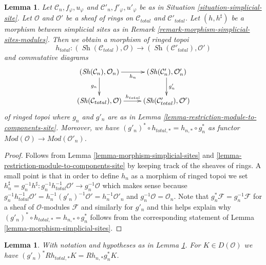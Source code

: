 \documentclass{stacks-project}
\theoremstyle{plain}
\newtheorem{lemma}[subsection]{Lemma}
\theoremstyle{definition}
\theoremstyle{remark}
\numberwithin{equation}{subsection}
\def\Sh{\mathop{\mathit{Sh}}\nolimits}
\begin{document}
\begin{lemma}
\label{lemma-morphism-simplicial-sites-modules}
Let $\mathcal{C}_n, f_\varphi, u_\varphi$ and
$\mathcal{C}'_n, f'_\varphi, u'_\varphi$ be as in
Situation \ref{situation-simplicial-site}.
Let $\mathcal{O}$ and $\mathcal{O}'$
be a sheaf of rings on $\mathcal{C}_{total}$ and $\mathcal{C}'_{total}$.
Let $(h, h^\sharp)$ be a morphism between simplicial sites as in
Remark \ref{remark-morphism-simplicial-sites-modules}.
Then we obtain a morphism of ringed topoi
$$
h_{total} :
(\Sh(\mathcal{C}_{total}), \mathcal{O})
\to
(\Sh(\mathcal{C}'_{total}), \mathcal{O}')
$$
and commutative diagrams
$$
\xymatrix{
(\Sh(\mathcal{C}_n), \mathcal{O}_n) \ar[d]_{g_n} \ar[r]_{h_n} &
(\Sh(\mathcal{C}'_n), \mathcal{O}'_n) \ar[d]^{g'_n} \\
(\Sh(\mathcal{C}_{total}), \mathcal{O}) \ar[r]^{h_{total}} &
(\Sh(\mathcal{C}'_{total}), \mathcal{O}')
}
$$
of ringed topoi where $g_n$ and $g'_n$ are as in
Lemma \ref{lemma-restriction-module-to-components-site}.
Moreover, we have
$(g'_n)^* \circ h_{total, *} = h_{n, *} \circ g_n^*$
as functor $\textit{Mod}(\mathcal{O}) \to \textit{Mod}(\mathcal{O}'_n)$.
\end{lemma}

\begin{proof}
Follows from
Lemma \ref{lemma-morphism-simplicial-sites} and
\ref{lemma-restriction-module-to-components-site}
by keeping track of the sheaves of rings.
A small point is that in order to define $h_n$ as a morphism
of ringed topoi we set
$h_n^\sharp = g_n^{-1}h^\sharp :
g_n^{-1}h_{total}^{-1}\mathcal{O}' \to g_n^{-1}\mathcal{O}$
which makes sense because
$g_n^{-1}h_{total}^{-1}\mathcal{O}' = h_n^{-1}(g'_n)^{-1}\mathcal{O}' =
h_n^{-1}\mathcal{O}'_n$ and $g_n^{-1}\mathcal{O} = \mathcal{O}_n$.
Note that $g_n^*\mathcal{F} = g_n^{-1}\mathcal{F}$
for a sheaf of $\mathcal{O}$-modules $\mathcal{F}$
and similarly for $g'_n$ and this helps explain why
$(g'_n)^* \circ h_{total, *} = h_{n, *} \circ g_n^*$
follows from the corresponding statement of
Lemma \ref{lemma-morphism-simplicial-sites}.
\end{proof}

\begin{lemma}
\label{lemma-direct-image-morphism-simplicial-sites-modules}
With notation and hypotheses as in
Lemma \ref{lemma-morphism-simplicial-sites-modules}.
For $K \in D(\mathcal{O})$ we have
$(g'_n)^*Rh_{total, *}K = Rh_{n, *}g_n^*K$.
\end{lemma}
\end{document}
